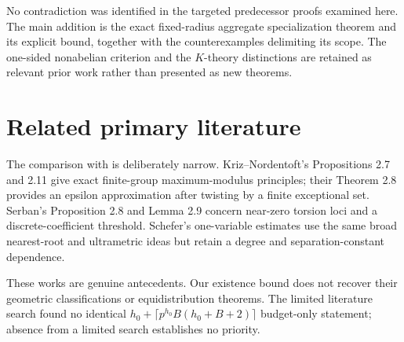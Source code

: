 No contradiction was identified in the targeted predecessor proofs
examined here. The main addition is the exact fixed-radius aggregate
specialization theorem and its explicit bound, together with the
counterexamples delimiting its scope. The one-sided nonabelian criterion
and the \(K\)-theory distinctions are retained as relevant prior
work rather than presented as new theorems.

\section{Related primary literature}
\label{sec:literature}

The comparison with \cite{kn,serban,schefer} is deliberately narrow.
Kriz--Nordentoft's Propositions 2.7 and 2.11 give exact finite-group
maximum-modulus principles; their Theorem 2.8 provides an
epsilon approximation after twisting by a finite exceptional set.
Serban's Proposition 2.8 and Lemma 2.9 concern near-zero torsion loci
and a discrete-coefficient threshold. Schefer's one-variable estimates
use the same broad nearest-root and ultrametric ideas but retain a
degree and separation-constant dependence.

These works are genuine antecedents. Our existence bound does not
recover their geometric classifications or equidistribution theorems.
The limited literature search found no identical
\(h_0+\lceil p^{h_0}B(h_0+B+2)\rceil\) budget-only statement;
absence from a limited search establishes no priority.

